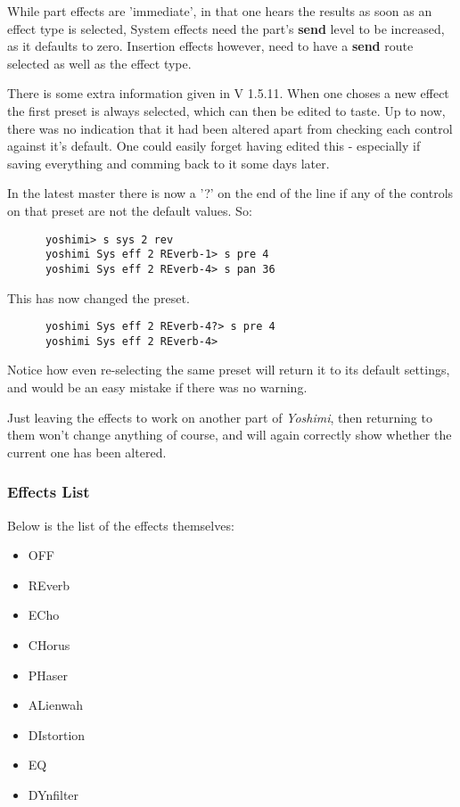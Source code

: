    While part effects are 'immediate', in that one hears the results as soon as
   an effect type is selected, System effects need the part's \textbf{send} level
   to be increased, as it defaults to zero. Insertion effects however, need to
   have a \textbf{send} route selected as well as the effect type.

   There is some extra information given in V 1.5.11.
   When one choses a new effect the first preset is always selected, which can
   then be edited to taste. Up to now, there was no indication that it had
   been altered apart from checking each control against it's default. One
   could easily forget having edited this - especially if saving everything and
   comming back to it some days later.

   In the latest master there is now a '?' on the end of the line if any of the
   controls on that preset are not the default values.
   So:
   \begin{verbatim}
      yoshimi> s sys 2 rev
      yoshimi Sys eff 2 REverb-1> s pre 4
      yoshimi Sys eff 2 REverb-4> s pan 36
   \end{verbatim}
   This has now changed the preset.
   \begin{verbatim}
      yoshimi Sys eff 2 REverb-4?> s pre 4
      yoshimi Sys eff 2 REverb-4>
   \end{verbatim}
   Notice how even re-selecting the same preset will return it to its default
   settings, and would be an easy mistake if there was no warning.

   Just leaving the effects to work on another part of \textsl{Yoshimi}, then
   returning to them won't change anything of course, and will again correctly
   show whether the current one has been altered.

\subsubsection{Effects List}
\label{subsubsec:command_line_effects_list}
   Below is the list of the effects themselves:
   \begin{itemize}
      \item OFF
      \item REverb
      \item ECho
      \item CHorus
      \item PHaser
      \item ALienwah
      \item DIstortion
      \item EQ
      \item DYnfilter
   \end{itemize}

